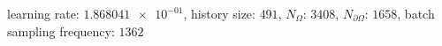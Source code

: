 learning rate: $\num[scientific-notation=true]{1.868041e-01}$, history size: $\num[scientific-notation=false]{491}$, $N_{\Omega}$: $\num[scientific-notation=false]{3408}$, $N_{\partial\Omega}$: $\num[scientific-notation=false]{1658}$, batch sampling frequency: $\num[scientific-notation=false]{1362}$